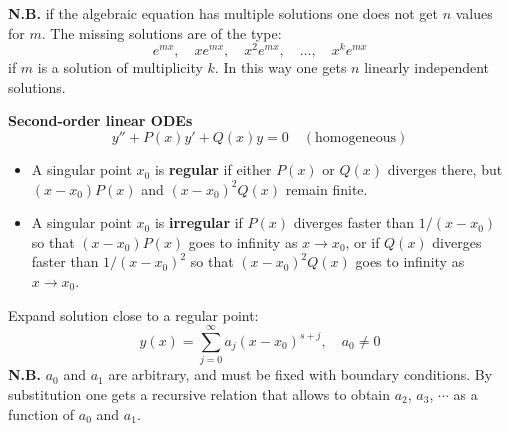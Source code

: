 \documentclass{article}
\begin{document}
\noindent
\textbf{N.B.} if the algebraic equation has multiple solutions one does not get $n$ values for $m$. The missing solutions are of the type:
\begin{equation}
    e^{mx}, \quad x e^{mx}, \quad x^2 e^{mx}, \quad \ldots, \quad x^k e^{mx}
\end{equation}
if $m$ is a solution of multiplicity $k$. In this way one gets $n$ linearly independent solutions. 

\vspace{2mm}\noindent
\textbf{Second-order linear ODEs}
\begin{equation}
    y'' + P(x)y' + Q(x)y = 0 \quad (\text{homogeneous})
\end{equation}
\begin{itemize}
    \item A singular point $x_0$ is \textbf{regular} if either $P(x)$ or $Q(x)$ diverges there, but $(x - x_0) P(x)$ and $(x - x_0)^2 Q(x)$ remain finite.
    \item A singular point $x_0$ is \textbf{irregular} if $P(x)$ diverges faster than $1/(x - x_0)$ so that $(x - x_0) P(x)$ goes to infinity as $x \to x_0$, or if $Q(x)$ diverges faster than $1/(x - x_0)^2$ so that $(x - x_0)^2 Q(x)$ goes to infinity as $x \to x_0$.
\end{itemize}
\newpage

\noindent
Expand solution close to a regular point:
\begin{equation}
    y(x) = \sum_{j=0}^{\infty} a_j (x - x_0)^{s + j}, \quad a_0 \ne 0
\end{equation}
\textbf{N.B. } $a_0$ and $a_1$ are arbitrary, and must be fixed with boundary conditions. By substitution one gets a recursive relation that allows to obtain $a_2$, $a_3$, $\cdots$ as a function of $a_0$ and $a_1$.
\end{document}
